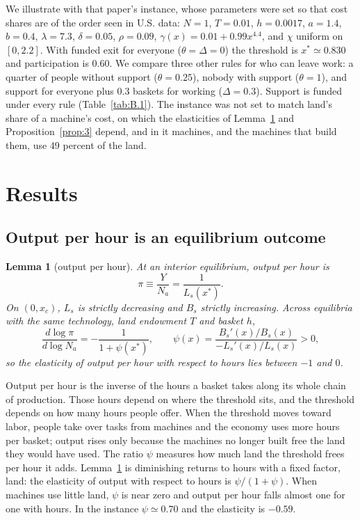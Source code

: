 \documentclass[12pt]{article}
\theoremstyle{plain}
\newtheorem{lemma}{Lemma}
\begin{document}
We illustrate with that paper's instance, whose parameters were set so that cost shares are of the order seen in U.S. data: $N=1$, $T=0.01$, $h=0.0017$, $a=1.4$, $b=0.4$, $\lambda=7.3$, $\delta=0.05$, $\rho=0.09$, $\gamma(x)=0.01+0.99x^{4.4}$, and $\chi$ uniform on $[0,2.2]$. With funded exit for everyone ($\theta=\Delta=0$) the threshold is $x^*\simeq0.830$ and participation is 0.60. We compare three other rules for who can leave work: a quarter of people without support ($\theta=0.25$), nobody with support ($\theta=1$), and support for everyone plus 0.3 baskets for working ($\Delta=0.3$). Support is funded under every rule (Table~\ref{tab:B.1}). The instance was not set to match land's share of a machine's cost, on which the elasticities of Lemma~\ref{lem:1} and Proposition~\ref{prop:3} depend, and in it machines, and the machines that build them, use 49 percent of the land.

\section{Results}\label{sec:4}

\subsection{Output per hour is an equilibrium outcome}\label{sec:4.1}

\begin{lemma}[output per hour]\label{lem:1}
At an interior equilibrium, output per hour is
\begin{equation}\label{eq:8}
\pi\equiv\frac{Y}{N_a}=\frac{1}{L_s(x^*)}.
\end{equation}
On $(0,x_c)$, $L_s$ is strictly decreasing and $B_s$ strictly increasing. Across equilibria with the same technology, land endowment $T$ and basket $h$,
\begin{equation}\label{eq:9}
\frac{d\log\pi}{d\log N_a}=-\frac{1}{1+\psi(x^*)},\qquad
\psi(x)=\frac{B_s'(x)/B_s(x)}{-L_s'(x)/L_s(x)}>0,
\end{equation}
so the elasticity of output per hour with respect to hours lies between $-1$ and $0$.
\end{lemma}

Output per hour is the inverse of the hours a basket takes along its whole chain of production. Those hours depend on where the threshold sits, and the threshold depends on how many hours people offer. When the threshold moves toward labor, people take over tasks from machines and the economy uses more hours per basket; output rises only because the machines no longer built free the land they would have used. The ratio $\psi$ measures how much land the threshold frees per hour it adds. Lemma~\ref{lem:1} is diminishing returns to hours with a fixed factor, land: the elasticity of output with respect to hours is $\psi/(1+\psi)$. When machines use little land, $\psi$ is near zero and output per hour falls almost one for one with hours. In the instance $\psi\simeq0.70$ and the elasticity is $-0.59$.
\end{document}
